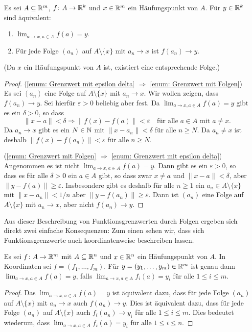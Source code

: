 \documentclass[a4paper,10pt]{article}
\begin{document}
\begin{lem}
 Es sei $A \subseteq \mathbb{R}^m$, $f \colon A \to \mathbb{R}^k$ und $x \in \mathbb{R}^m$ ein Häufungspunkt von $A$. Für $y \in \mathbb{R}^k$ sind äquivalent:
 \begin{enumerate}
  \item\label{enum: Grenzwert mit epsilon delta}
   $\lim_{a \to x, a \in A} f(a) = y$.
  \item\label{enum: Grenzwert mit Folgen}
   Für jede Folge $(a_n)$ auf $A \setminus \{x\}$ mit $a_n \to x$ ist $f(a_n) \to y$.
 \end{enumerate}
 (Da $x$ ein Häufungspunkt von $A$ ist, existiert eine entsprechende Folge.)
\end{lem}
\begin{proof}
 (\ref{enum: Grenzwert mit epsilon delta} $\Rightarrow$ \ref{enum: Grenzwert mit Folgen}) Es sei $(a_n)$ eine Folge auf $A \setminus \{x\}$ mit $a_n \to x$. Wir wollen zeigen, dass $f(a_n) \to y$. Sei hierfür $\varepsilon > 0$ beliebig aber fest. Da $\lim_{a \to x, a \in A} f(a) = y$ gibt es ein $\delta > 0$, so dass
 \[
  \|x-a\| < \delta \Rightarrow \|f(x)-f(a)\| < \varepsilon
  \quad \text{für alle $a \in A$ mit $a \neq x$}.
 \]
 Da $a_n \to x$ gibt es ein $N \in \mathbb{N}$ mit $\|x - a_n\| < \delta$ für alle $n \geq N$. Da $a_n \neq x$ ist deshalb $\|f(x)-f(a_n)\| < \varepsilon$ für alle $n \geq N$.
 
 (\ref{enum: Grenzwert mit Folgen} $\Rightarrow$ \ref{enum: Grenzwert mit epsilon delta}) Angenommen es ist nicht $\lim_{a \to x, a \in A} f(a) = y$. Dann gibt es ein $\varepsilon > 0$, so dass es für alle $\delta > 0$ ein $a \in A$ gibt, so dass zwar $x \neq a$ und $\|x-a\| < \delta$, aber $\|y-f(a)\| \geq \varepsilon$. Insbesondere gibt es deshalb für alle $n \geq 1$ ein $a_n \in A \setminus \{x\}$ mit $\|x-a_n\| < 1/n$ aber $\|y-f(a_n)\| \geq \varepsilon$. Dann ist $(a_n)$ eine Folge auf $A \setminus \{x\}$ mit $a_n \to x$, aber nicht $f(a_n) \rightarrow y$.
\end{proof}


Aus dieser Beschreibung von Funktionsgrenzwerten durch  Folgen ergeben sich direkt zwei einfache Konsequenzen: Zum einen sehen wir, dass sich Funktionsgrenzwerte auch koordinatenweise beschreiben lassen.


\begin{lem}
 Es sei $f \colon A \to \mathbb{R}^m$ mit $A \subseteq \mathbb{R}^n$ und $x \in \mathbb{R}^n$ ein Häufungspunkt von $A$. In Koordinaten sei $f = (f_1, \dotsc, f_m)$. Für $y = (y_1, \dotsc, y_m) \in \mathbb{R}^m$ ist genau dann $\lim_{a \to x, a \in A} f(a) = y$, falls $\lim_{a \to x, a \in A} f_i(a) = y_i$ für alle $1 \leq i \leq m$.
\end{lem}
\begin{proof}
 Das $\lim_{a \to x, a \in A} f(a) = y$ ist äquivalent dazu, dass für jede Folge $(a_n)$ auf $A \setminus \{x\}$ mit $a_n \to x$ auch $f(a_n) \to y$. Dies ist äquivalent dazu, dass für jede Folge $(a_n)$ auf $A \setminus \{x\}$ auch $f_i(a_n) \to y_i$ für alle $1 \leq i \leq m$. Dies bedeutet wiederum, dass $\lim_{a \to x, a \in A} f_i(a) = y_i$ für alle $1 \leq i \leq n$.
\end{proof}
\end{document}
